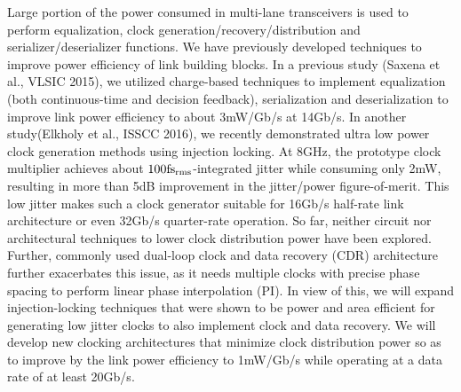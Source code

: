 Large portion of the power consumed in multi-lane transceivers is used to perform equalization, clock generation/recovery/distribution and serializer/deserializer functions. 
We have previously developed techniques to improve power efficiency of link building blocks.
In a previous study (Saxena et al., VLSIC 2015), we utilized charge-based techniques to implement equalization (both continuous-time and decision feedback), serialization and deserialization to improve link power efficiency to about 3mW/Gb/s at 14Gb/s. 
In another study(Elkholy et al., ISSCC 2016), we recently demonstrated ultra low power clock generation methods using injection locking. 
At 8GHz, the prototype clock multiplier achieves about $\rm 100 fs_{rms}$-integrated jitter while consuming only 2mW, resulting in more than 5dB improvement in the jitter/power figure-of-merit. 
This low jitter makes such a clock generator suitable for 16Gb/s half-rate link architecture or even 32Gb/s quarter-rate operation. 
So far, neither circuit nor architectural techniques to lower clock distribution power have been explored. 
Further, commonly used dual-loop clock and data recovery (CDR) architecture further exacerbates this issue, as it needs multiple clocks with precise phase spacing to perform linear phase interpolation (PI). 
In view of this, we will expand injection-locking techniques that were shown to be power and area efficient for generating low jitter clocks to also implement clock and data recovery. 
We will develop new clocking architectures that minimize clock distribution power so as to improve by the link power efficiency to 1mW/Gb/s while operating at a data rate of at least 20Gb/s.

